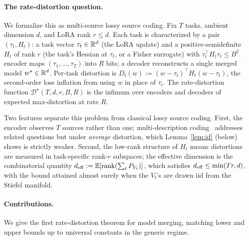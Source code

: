 \paragraph{The rate-distortion question.} We formalize this as
multi-source lossy source coding.  Fix $T$ tasks, ambient dimension $d$,
and LoRA rank $r\leq d$. Each task is characterized by a pair
$(\tau_t, H_t)$: a task vector $\tau_t\in\mathbb{R}^d$ (the LoRA
update) and a positive-semidefinite $H_t$ of rank $r$ (the
task's Hessian at $\tau_t$, or a Fisher surrogate) with
$\tau_t^\top H_t\tau_t\leq B^2$. 
encoder maps $(\tau_1,\ldots,\tau_T)$ into $R$ bits; a decoder
reconstructs a single merged model $w^\star\in\mathbb{R}^d$. Per-task
distortion is $D_t(w) := (w-\tau_t)^\top H_t (w-\tau_t)$, the
second-order loss inflation from using $w$ in place of $\tau_t$.
 The rate-distortion function
$\mathcal{D}^\star(T,d,r,B,R)$ is the infimum over encoders and
decoders of expected max-distortion 
at rate $R$.

Two features separate this problem from classical lossy
source coding. First, the encoder observes $T$ sources rather
than one; multi-description coding~\cite{elgamalcover1982md}
addresses related questions but under \emph{average} distortion,
which Lemma~\ref{lem:id} (below) shows is strictly weaker.
Second, the low-rank structure of $H_t$ means distortions are
measured in task-specific rank-$r$ subspaces; the effective
dimension is the combinatorial quantity $d_{\mathrm{eff}} := \mathbb{E}[\operatorname{rank}
(\sum_t P_{V_t})]$, which satisfies $d_{\mathrm{eff}} \leq \min(Tr, d)$,
with the bound attained almost surely when the $V_t$'s are
drawn iid from the Stiefel manifold.

\paragraph{Contributions.} We give the first rate-distortion
theorem for model merging, matching lower and upper bounds up
to universal constants in the generic regime.

